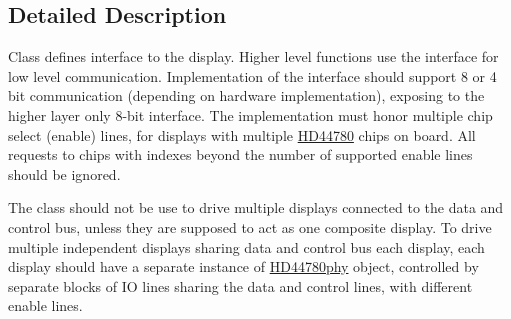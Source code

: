 \subsection{Detailed Description}
Class defines interface to the display. Higher level functions use the interface for low level communication. Implementation of the interface should support 8 or 4 bit communication (depending on hardware implementation), exposing to the higher layer only 8-\/bit interface. The implementation must honor multiple chip select (enable) lines, for displays with multiple \hyperlink{class_h_d44780}{H\-D44780} chips on board. All requests to chips with indexes beyond the number of supported enable lines should be ignored.

The class should not be use to drive multiple displays connected to the data and control bus, unless they are supposed to act as one composite display. To drive multiple independent displays sharing data and control bus each display, each display should have a separate instance of \hyperlink{class_h_d44780phy}{H\-D44780phy} object, controlled by separate blocks of I\-O lines sharing the data and control lines, with different enable lines. 

